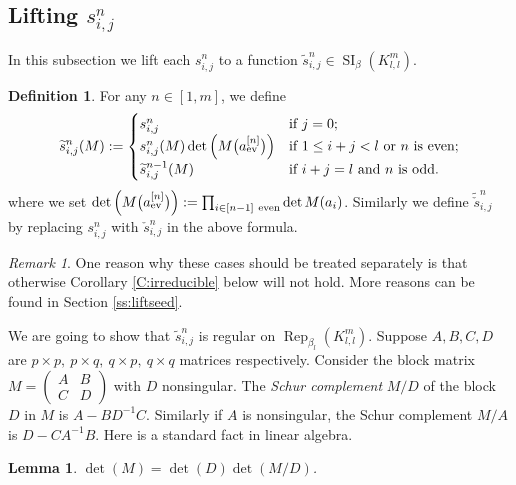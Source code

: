 \documentclass{amsart}
\newtheorem{lemma}[theorem]{Lemma}
\theoremstyle{definition}
\newtheorem{definition}[theorem]{Definition}
\theoremstyle{remark}
\newtheorem{remark}[theorem]{Remark}
\numberwithin{equation}{section}
\DeclareMathOperator{\Rep}{Rep}
\DeclareMathOperator{\SI}{SI}
\newcommand{\wtd}[1]{\widetilde{#1}}
\newcommand{\sm}[1]{{\left(\begin{smallmatrix}#1\end{smallmatrix}\right)}}
\newcommand{\kllm}{{K_{l,l}^m}}
\newcommand{\bl}{{\beta_l}}
\newcommand{\ijn}{_{i,j}^{n}}
\begin{document}

\subsection{Lifting $s\ijn$} \label{ss:liftsi}
In this subsection we lift each $s\ijn$ to a function $\wtd{s}\ijn\in\SI_\beta(\kllm)$.
\begin{definition} \label{D:liftsijn} For any $n\in [1,m]$, we define 
	$$\wtd{s}\ijn(M):= \begin{cases}
		s\ijn & \text{if } j=0;\\
		s\ijn(M)\det\left(M\big(a_{\rm ev}^{[n]}\big)\right) & \text{if } 1\leq i+j<l \text{ or $n$ is even};\\
		\wtd{s}_{i,j}^{n-1}(M) & \text{if } i+j=l \text{ and $n$ is odd}.
\end{cases}$$
where we set $\det\left(M\big(a_{\rm ev}^{[n]}\big)\right):=\prod_{i\in[n-1]\rm\ even} \det M(a_i)$.
Similarly we define $\wtd{\check{s}}\ijn$ by replacing $s\ijn$ with $\check{s}\ijn$ in the above formula. 
\end{definition}

\begin{remark} One reason why these cases should be treated separately is that otherwise Corollary \ref{C:irreducible} below will not hold.
	More reasons can be found in Section \ref{ss:liftseed}.
\end{remark}

We are going to show that $\wtd{s}\ijn$ is regular on $\Rep_{\bl}(\kllm)$. 
Suppose $A,B,C,D$ are $p\times p,\ p\times q,\ q\times p,\ q\times q$ matrices respectively.
Consider the block matrix $M=\sm{A & B \\ C & D}$ with $D$ nonsingular.
The {\em Schur complement} $M/D$ of the block $D$ in $M$ is
$A-BD^{-1}C$.
Similarly if $A$ is nonsingular, the Schur complement $M/A$ is $D-CA^{-1}B$.
Here is a standard fact in linear algebra.

\begin{lemma} \label{L:blockdet} $\det(M)=\det(D)\det(M/D)$.
\end{lemma}
\end{document}
